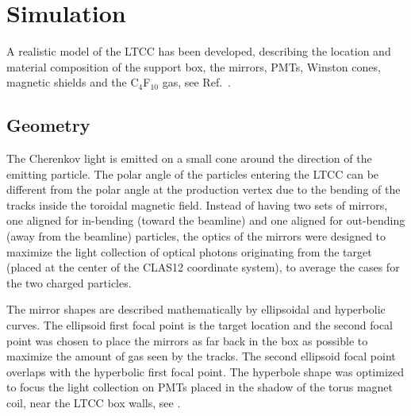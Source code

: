 \section{Simulation}

A realistic model of the LTCC has been developed, describing the location and material composition
of the support box, the mirrors, PMTs, Winston cones, magnetic shields and the C$_4$F$_{10}$ gas, see
Ref.~\cite{sim-nim}. 


\subsection{Geometry}

The Cherenkov light is emitted on a small cone around the direction of the emitting particle. The polar angle of
the particles entering the LTCC can be different from the polar angle at the production vertex due
to the bending of the tracks inside the toroidal magnetic field.
Instead of having two sets of mirrors, one aligned for in-bending (toward the beamline) and one aligned for
out-bending (away from the beamline) particles, the optics of the mirrors were designed to maximize the
light collection of optical photons originating from the target (placed at the center of the CLAS12 coordinate system),
to average the cases for the two charged particles.

The mirror shapes are described mathematically by ellipsoidal and hyperbolic curves.
The ellipsoid first focal point is the target location and the second focal point was chosen
to place the mirrors as far back in the box as possible to maximize the amount of gas seen by the tracks.
The second ellipsoid focal point overlaps with the hyperbolic first focal point. The hyperbole shape was optimized to
focus the light collection on PMTs placed in the shadow of the torus magnet coil, near the LTCC box walls,
see .

